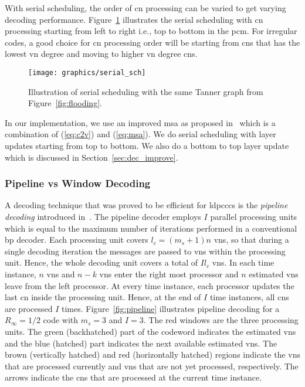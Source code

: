 With serial scheduling, the order of \ac{cn} processing can be varied to get varying decoding performance. Figure~\ref{fig:serial_sch} illustrates the serial scheduling with \ac{cn} processing starting from left to right i.e., top to bottom in the \ac{pcm}. For irregular codes, a good choice for \ac{cn} processing order will be starting from \acp{cn} that has the lowest \ac{vn} degree and moving to higher \ac{vn} degree \acp{cn}.

\begin{figure}[htbp]
  \centering
  \texttt{[image: graphics/serial\_sch]}
  \caption{Illustration of serial scheduling with the same Tanner graph from Figure~\ref{fig:flooding}.}
  \label{fig:serial_sch}
\end{figure}

In our implementation, we use an improved \ac{msa} as proposed in~\cite{Jones2003} which is a combination of (\ref{eq:c2v}) and (\ref{eq:msa}). We do serial scheduling with layer updates starting from top to bottom. We also do a bottom to top layer update which is discussed in Section~\ref{sec:dec_improve}.

\subsubsection{Pipeline vs Window Decoding}\label{sec:back_wd}
A decoding technique that was proved to be efficient for \acp{ldpccc} is the \emph{pipeline decoding} introduced in~\cite{Felstrom1999}. The pipeline decoder employs $I$ parallel processing units which is equal to the maximum number of iterations performed in a conventional \ac{bp} decoder. Each processing unit covers $l_c=(m_s+1)n$ \acp{vn}, so that during a single decoding iteration the messages are passed to \acp{vn} within the processing unit. Hence, the whole decoding unit covers a total of $Il_c$ \acp{vn}. In each time instance, $n$ \acp{vn} and $n-k$ \acp{vn} enter the right most processor and $n$ estimated \acp{vn} leave from the left processor. At every time instance, each processor updates the last \ac{cn} inside the processing unit. Hence, at the end of $I$ time instances, all \acp{cn} are processed $I$ times. Figure~\ref{fig:pipeline} illustrates pipeline decoding for a $R_\infty=1/2$ code with $m_s=3$ and $I=3$. The red windows are the three processing units. The green (backhatched) part of the codeword indicates the estimated \acp{vn} and the blue (hatched) part indicates the next available estimated \acp{vn}. The brown (vertically hatched) and red (horizontally hatched) regions indicate the \acp{vn} that are processed currently and \acp{vn} that are not yet processed, respectively. The arrows indicate the \acp{cn} that are processed at the current time instance.

